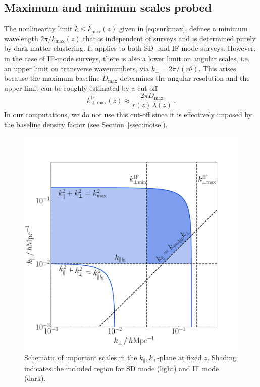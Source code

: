 \subsection{Maximum and minimum scales probed}
%
The nonlinearity limit $k\leq k_\mathrm{max}(z)$ given in \eqref{eq:snrkmax}, defines a minimum wavelength $2\pi/ k_\mathrm{max}(z)$ that is independent of surveys and is determined purely by dark matter clustering. It applies to both SD- and IF-mode surveys.
However, in the case
of IF-mode surveys, there is also a lower limit on angular scales, i.e. an upper limit on transverse wavenumbers, via $k_\perp=2\pi/(r\theta)$. This arises because the maximum baseline $D_\mathrm{max}$ determines the  angular resolution  and the upper limit can be roughly estimated by a cut-off~\cite{Bull:2014rha,Alonso:2017dgh,Karagiannis:2019jjx,Durrer:2020orn}
\begin{equation} \label{kifmax}
k_{\perp \mathrm{max}}^{\mathrm{IF}}(z) \approx \frac{2\pi D_\mathrm{max}}{r(z)\,\lambda(z)}\,.
\end{equation}
In our computations, we do not use this cut-off since it is effectively imposed by the baseline density factor (see Section~\ref{ssec:inoise}).
\begin{figure}[h]
\centering
\includegraphics[width=.49\textwidth]{fig/kplane}
\caption{{Schematic of important scales in the $k_\|,k_\perp$-plane at fixed $z$. Shading indicates the included region for SD mode (light) and IF mode (dark).}}\label{kplane}
\end{figure}


